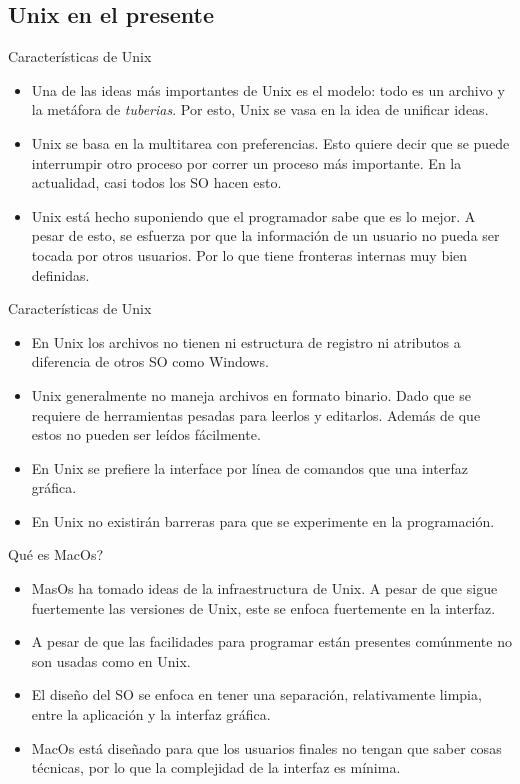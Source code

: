 \documentclass[11pt]{beamer}
\begin{document}
	\subsection{Unix en el presente}
		\begin{frame}{Características de Unix}
			\begin{itemize}
				\item Una de las ideas más importantes de Unix es el modelo: todo es un archivo y la metáfora de \textit{tuberias}. Por esto, Unix se vasa en la idea de unificar ideas.
				\item Unix se basa en la multitarea con preferencias. Esto quiere decir que se puede interrumpir otro proceso por correr un proceso más importante. En la actualidad, casi todos los SO hacen esto.
				\item Unix está hecho suponiendo que el programador sabe que es lo mejor. A pesar de esto, se esfuerza por que la información de un usuario no pueda ser tocada por otros usuarios. Por lo que tiene fronteras internas muy bien definidas.
			\end{itemize}
		\end{frame}
		\begin{frame}{Características de Unix}
			\begin{itemize}
				\item En Unix los archivos no tienen ni estructura de registro ni atributos a diferencia de otros SO como Windows.
				\item Unix generalmente no maneja archivos en formato binario. Dado que se requiere de herramientas pesadas para leerlos y editarlos. Además de que estos no pueden ser leídos fácilmente.
				\item En Unix se prefiere la interface por línea de comandos que una interfaz gráfica.
				\item En Unix no existirán barreras para que se experimente en la programación.
			\end{itemize}
		\end{frame}
		\begin{frame}{Qué es MacOs?}
			\begin{itemize}
				\item MasOs ha tomado ideas de la infraestructura de Unix. A pesar de que sigue fuertemente las versiones de Unix, este se enfoca fuertemente en la interfaz.
				\item A pesar de que las facilidades para programar están presentes comúnmente no son usadas como en Unix. 
				\item El diseño del SO se enfoca en tener una separación, relativamente limpia, entre la aplicación y la interfaz gráfica.
				\item MacOs está diseñado para que los usuarios finales no tengan que saber cosas técnicas, por lo que la complejidad de la interfaz es mínima.
			\end{itemize}
		\end{frame}
\end{document}

